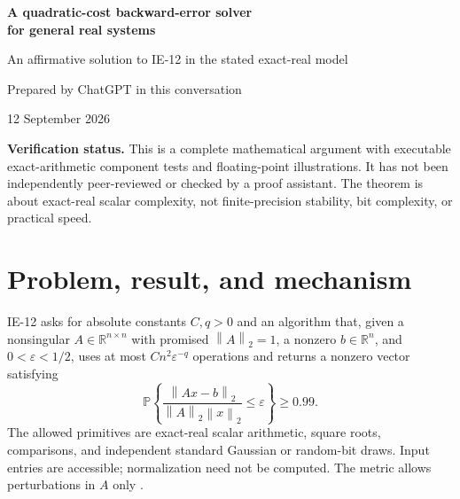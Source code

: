 \documentclass[11pt,a4paper]{article}
\theoremstyle{remark}
\newcommand{\R}{\mathbb R}
\newcommand{\PP}{\mathbb P}
\newcommand{\eps}{\varepsilon}
\newcommand{\norm}[1]{\left\|#1\right\|_2}
\begin{document}
\thispagestyle{plain}
\begin{center}
{\color{inkblue}\Large\bfseries A quadratic-cost backward-error solver\\[4pt]
for general real systems}\par
\vspace{7pt}
{\large An affirmative solution to IE-12 in the stated exact-real model}\par
\vspace{9pt}
{Prepared by ChatGPT in this conversation}\par
{12 September 2026}
\end{center}

\begin{abstract}
We give an explicit randomized algorithm for the normalized, fully accessible
real linear-system problem in IE-12. Its deterministic worst-case operation
count is $O(n^2\eps^{-3})$; with probability greater than $0.997$ its nonzero
output satisfies $\norm{Ax-b}/\norm{x}\le 5\eps/8$. Thus the answer to IE-12
is affirmative with $q=3$. The algorithm rounds $A$ once to a nearby scaled
integer matrix. A weighted-pattern multiplication scheme supports repeated
products with this matrix and its transpose more cheaply than dense products.
A rectangular augmented system supplies an exact kernel, and a fixed-length
randomly started polynomial filter finds an approximate kernel vector.
A clamping step converts it to the required backward-error guarantee without
perturbing $b$. The logarithm in the iteration count is canceled by the
preprocessed product cost, not removed from convergence itself. All essential
lemmas, probability estimates, model details, and cost bounds are proved below.
\end{abstract}

\noindent\textbf{Verification status.} This is a complete mathematical argument
with executable exact-arithmetic component tests and floating-point
illustrations. It has not been independently peer-reviewed or checked by a
proof assistant. The theorem is about exact-real scalar complexity, not
finite-precision stability, bit complexity, or practical speed.

\section{Problem, result, and mechanism}

IE-12 asks for absolute constants $C,q>0$ and an algorithm that, given a
nonsingular $A\in\R^{n\times n}$ with promised $\norm{A}=1$, a nonzero
$b\in\R^n$, and $0<\eps<1/2$, uses at most $Cn^2\eps^{-q}$ operations and
returns a nonzero vector satisfying
\begin{equation}\label{eq:target}
 \PP\!\left\{\frac{\norm{Ax-b}}{\norm{A}\norm{x}}\le\eps\right\}\ge0.99.
\end{equation}
The allowed primitives are exact-real scalar arithmetic, square roots,
comparisons, and independent standard Gaussian or random-bit draws. Input
entries are accessible; normalization need not be computed. The metric allows
perturbations in $A$ only \cite{ie12}.
\end{document}
